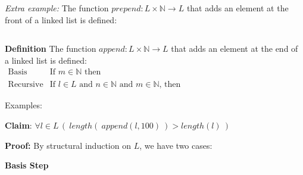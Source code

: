 \documentclass[12pt, oneside]{article}
\begin{document}
\vfill


{\it Extra example:} The function $prepend : L \times \mathbb{N} \to L$ that adds an element at the front of a linked list is defined:
\[
\phantom{prepend(l, n) = (n, l)}
\]


\vfill

{\bf Definition} The function $\textit{append} : L \times \mathbb{N} \to L$ that adds an element at the end of a linked list is defined:
\[
\begin{array}{llll}
\textrm{Basis Step:} & \textrm{If } m \in \mathbb{N}\textrm{ then } & \phantom{\textit{append}([], m)} & \phantom{= (m, []) }\\
\textrm{Recursive Step:} & \textrm{If } l \in L\textrm{ and }n \in \mathbb{N}\textrm{ and }m \in \mathbb{N}\textrm{, then  } & \phantom{\textit{append}((n, l), m) } &\phantom{= (n, \textit{append}(l, m))}
\end{array}
\]

Examples: 

\vfill 

\newpage
{\bf Claim}: $\forall l \in L \, (~length(~append(l, 100)~) > length(l)~)$

{\bf Proof:} By structural induction on $L$, we have two cases:

\vspace{-10pt}

{\bf Basis Step}

\vspace{-10pt}
\end{document}
